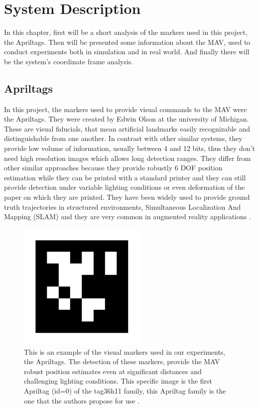 \chapter{System Description}
\label{sec:SystemDescription}

In this chapter, first will be a short analysis of the markers used in this project, the Apriltags. Then will be presented some information about the MAV, used to conduct experiments both in simulation and in real world. And finally there will be the system's coordinate frame analysis.

\section{Apriltags}
\label{sec:apriltags} 

In this project, the markers used to provide visual commands to the MAV were the Apriltags. They were created by Edwin Olson at the university of Michigan. These are visual fiducials, that mean artificial landmarks easily recognizable and distinguishable from one another. In contrast with other similar systems, they provide low volume of information, usually between 4 and 12 bits, thus they don't need high resolution images which allows long detection ranges. They differ from other similar approaches because they provide robustly 6 DOF position estimation while they can be printed with a standard printer and they can still provide detection under variable lighting conditions or even deformation of the paper on which they are printed. They have been widely used to provide ground truth trajectories in structured environments, Simultaneous Localization And Mapping (SLAM) and they are very common in augmented reality applications \cite{olson2011tags}.

\begin{figure}
   \centering
   \includegraphics[width=0.55\textwidth]{images/tag36h11_im_large.pdf}
   \caption{This is an example of the visual markers used in our experiments, the Apriltags. The detection of these markers, provide the MAV robust position estimates even at significant distances and challenging lighting conditions. This specific image is the first Apriltag (id=0) of the tag36h11 family, this Apriltag family is the one that the authors propose for use \cite{olson2011tags}.}
   \label{pics:tag36h11}
\end{figure}
 
